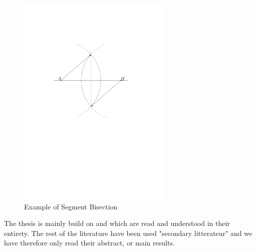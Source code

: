 \begin{figure}[H] 
	\centering
	\includegraphics[width=0.65\textwidth]{figures/bisector.pdf} 
	\caption{Example of Segment Bisection} 
	\label{fig:SegmentBisection} 
\end{figure}

\newpage
{}
The thesis is mainly build on \cite{HershbergerS99} and \cite{HershbergerKS17} which are read and understood in their entirety. The rest of the literature have been used "secondary litterateur" and we have therefore only read their abstract, or main results.

\newpage
\printindex

